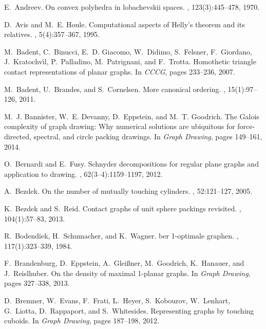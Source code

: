 \documentclass{article}
\begin{document}
\begin{thebibliography}{10}

E.~Andreev.
\newblock On convex polyhedra in lobachevskii spaces.
, 123(3):445--478, 1970.

D.~Avis and M.~E. Houle.
\newblock Computational aspects of {H}elly's theorem and its relatives.
, 5(4):357--367, 1995.

M.~Badent, C.~Binucci, E.~D. Giacomo, W.~Didimo, S.~Felsner, F.~Giordano,
  J.~Kratochv{\'\i}l, P.~Palladino, M.~Patrignani, and F.~Trotta.
\newblock Homothetic triangle contact representations of planar graphs.
\newblock In {\em CCCG}, pages 233--236, 2007.

M.~Badent, U.~Brandes, and S.~Cornelsen.
\newblock More canonical ordering.
, 15(1):97--126,
  2011.

M.~J. Bannister, W.~E. Devanny, D.~Eppstein, and M.~T. Goodrich.
\newblock The {G}alois complexity of graph drawing: Why numerical solutions are
  ubiquitous for force-directed, spectral, and circle packing drawings.
\newblock In {\em Graph Drawing}, pages 149--161, 2014.

O.~Bernardi and E.~Fusy.
\newblock Schnyder decompositions for regular plane graphs and application to
  drawing.
, 62(3--4):1159--1197, 2012.

A.~Bezdek.
\newblock On the number of mutually touching cylinders.
, 52:121--127, 2005.

K.~Bezdek and S.~Reid.
\newblock Contact graphs of unit sphere packings revisited.
, 104(1):57--83, 2013.

R.~Bodendiek, H.~Schumacher, and K.~Wagner.
ber 1-optimale graphen.
, 117(1):323--339, 1984.

F.~Brandenburg, D.~Eppstein, A.~Glei{\ss}ner, M.~Goodrich, K.~Hanauer, and
  J.~Reislhuber.
\newblock On the density of maximal 1-planar graphs.
\newblock In {\em Graph Drawing}, pages 327--338, 2013.

D.~Bremner, W.~Evans, F.~Frati, L.~Heyer, S.~Kobourov, W.~Lenhart, G.~Liotta,
  D.~Rappaport, and S.~Whitesides.
\newblock Representing graphs by touching cuboids.
\newblock In {\em Graph Drawing}, pages 187--198, 2012.


\end{thebibliography}
\end{document}

